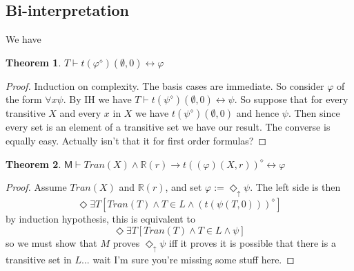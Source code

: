 \documentclass{article}
\newtheorem{Theorem}{Theorem}[section]
\theoremstyle{definition}
\newcommand{\du}{\Diamond_\uparrow}
\begin{document}
\subsection{Bi-interpretation}
We have
\begin{Theorem}
    $T \vdash t(\varphi^\diamond)(\emptyset, 0) \leftrightarrow \varphi$
\end{Theorem}
\begin{proof}
    Induction on complexity. The basis cases are immediate. So consider $\varphi$ of 
    the form $\forall x \psi$. By IH we have $T \vdash t(\psi^\diamond)(\emptyset, 0) \leftrightarrow \psi$.
    So suppose that for every transitive $X$ and every $x$ in $X$ we have  $t(\psi^\diamond)(\emptyset, 0)$
    and hence $\psi$. Then since every set is an element of a transitive set we have our result.
    The converse is equally easy. 
    Actually isn't that it for first order formulas?
\end{proof}
\begin{Theorem}
    $\mathsf{M} \vdash Tran(X) \wedge \mathbb{R}(r) \rightarrow t((\varphi)(X, r))^\diamond \leftrightarrow \varphi$
\end{Theorem}
\begin{proof}
    Assume $Tran(X)$ and $\mathbb{R}(r)$, and set $\varphi := \du \psi$. The left side is then 
    \[\Diamond \exists T [Tran(T) \wedge T \in L \wedge (t(\psi(T, 0)))^\diamond]\]
    by induction hypothesis, this is equivalent to 
    \[\Diamond \exists T [Tran(T) \wedge T \in L \wedge \psi]\]
    so we must show that $M$ proves $\du \psi$ iff it proves it is possible that 
    there is a transitive set in $L$... wait I'm sure you're missing some stuff here.
\end{proof}
\end{document}
